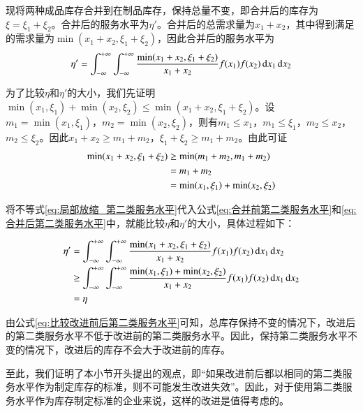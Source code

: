 现将两种成品库存合并到在制品库存，保持总量不变，即合并后的库存为$\xi=\xi_1+\xi_2$。合并后的服务水平为$\eta'$。合并后的总需求量为$x_1+x_2$，其中得到满足的需求量为$\min(x_1+x_2,\xi_1+\xi_2)$，因此合并后的服务水平为
\begin{equation}
\eta' = \int_{-\infty}^{+\infty}\int_{-\infty}^{+\infty}\frac{\min(x_1+x_2,\xi_1+\xi_2)}{x_1+x_2}f(x_1)f(x_2)\operatorname{d\!} x_1 \operatorname{d\!} x_2
\label{eq:合并后第二类服务水平}
\end{equation}

为了比较$\eta$和$\eta'$的大小，我们先证明$\min(x_1,\xi_1)+\min(x_2,\xi_2)\leq\min(x_1+x_2,\xi_1+\xi_2)$。设$m_1=\min(x_1,\xi_1)$，$m_2=\min(x_2,\xi_2)$，则有$m_1\leq x_1$，$m_1\leq\xi_1$，$m_2\leq x_2$，$m_2\leq\xi_2$。因此$x_1+x_2\geq m_1+m_2$，$\xi_1+\xi_2\geq m_1+m_2$。由此可证
\begin{align}
\min(x_1+x_2,\xi_1+\xi_2) &\geq \min(m_1+m_2,m_1+m_2) \notag\\
&= m_1+m_2 \notag\\
&= \min(x_1,\xi_1)+\min(x_2,\xi_2)
\label{eq:局部放缩_第二类服务水平}
\end{align}

将不等式\ref{eq:局部放缩_第二类服务水平}代入公式\ref{eq:合并前第二类服务水平}和\ref{eq:合并后第二类服务水平}中，就能比较$\eta$和$\eta'$的大小，具体过程如下：

\begin{align}
\eta' &= \int_{-\infty}^{+\infty}\int_{-\infty}^{+\infty}\frac{\min(x_1+x_2,\xi_1+\xi_2)}{x_1+x_2}f(x_1)f(x_2)\operatorname{d\!} x_1 \operatorname{d\!} x_2 \notag\\
&\geq \int_{-\infty}^{+\infty}\int_{-\infty}^{+\infty}\frac{\min(x_1,\xi_1)+\min(x_2,\xi_2)}{x_1+x_2}f(x_1)f(x_2)\operatorname{d\!} x_1 \operatorname{d\!} x_2 \notag\\
&= \eta
\label{eq:比较改进前后第二类服务水平}
\end{align}

由公式\ref{eq:比较改进前后第二类服务水平}可知，总库存保持不变的情况下，改进后的第二类服务水平不低于改进前的第二类服务水平。因此，保持第二类服务水平不变的情况下，改进后的库存不会大于改进前的库存。

至此，我们证明了本小节开头提出的观点，即“如果改进前后都以相同的第二类服务水平作为制定库存的标准，则不可能发生改进失效”。因此，对于使用第二类服务水平作为库存制定标准的企业来说，这样的改进是值得考虑的。












